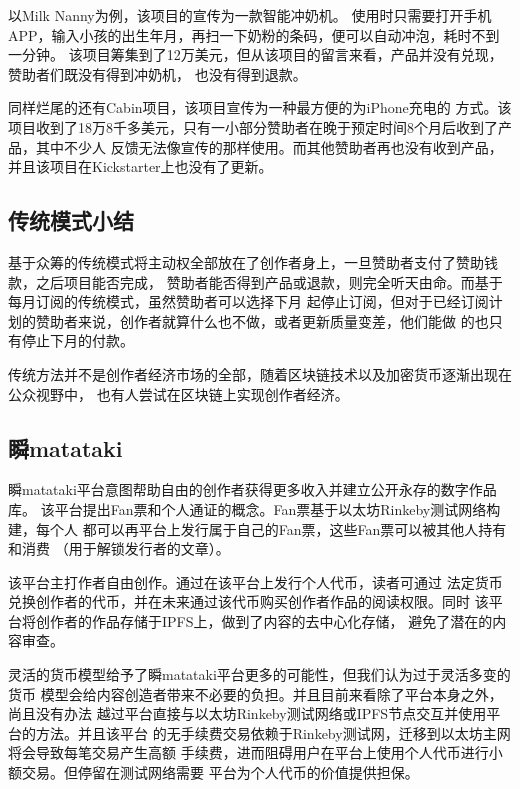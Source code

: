 \documentclass[11pt,UTF8,a4paper]{ctexart}
\begin{document}
    以Milk Nanny为例\cite{kickstarter_milk_nanny}，该项目的宣传为一款智能冲奶机。
    使用时只需要打开手机APP，输入小孩的出生年月，再扫一下奶粉的条码，便可以自动冲泡，耗时不到一分钟。
    该项目筹集到了12万美元，但从该项目的留言来看，产品并没有兑现，赞助者们既没有得到冲奶机，
    也没有得到退款。

    同样烂尾的还有Cabin项目\cite{kickstarter_cabin}，该项目宣传为一种最方便的为iPhone充电的
    方式。该项目收到了18万8千多美元，只有一小部分赞助者在晚于预定时间8个月后收到了产品，其中不少人
    反馈无法像宣传的那样使用。而其他赞助者再也没有收到产品，并且该项目在Kickstarter上也没有了更新。

    \subsection{传统模式小结}\label{subsec:tradition_summary}

    基于众筹的传统模式将主动权全部放在了创作者身上，一旦赞助者支付了赞助钱款，之后项目能否完成，
    赞助者能否得到产品或退款，则完全听天由命。而基于每月订阅的传统模式，虽然赞助者可以选择下月
    起停止订阅，但对于已经订阅计划的赞助者来说，创作者就算什么也不做，或者更新质量变差，他们能做
    的也只有停止下月的付款。

    传统方法并不是创作者经济市场的全部，随着区块链技术以及加密货币逐渐出现在公众视野中，
    也有人尝试在区块链上实现创作者经济。

    \subsection{瞬matataki}\label{subsec:blockchain_matataki}

    瞬matataki平台意图帮助自由的创作者获得更多收入并建立公开永存的数字作品库。
    该平台提出Fan票和个人通证的概念。Fan票基于以太坊Rinkeby测试网络构建，每个人
    都可以再平台上发行属于自己的Fan票，这些Fan票可以被其他人持有和消费
    （用于解锁发行者的文章）\cite{mitataki_fan_ticket}。

    该平台主打作者自由创作。通过在该平台上发行个人代币，读者可通过
    法定货币兑换创作者的代币，并在未来通过该代币购买创作者作品的阅读权限。同时
    该平台将创作者的作品存储于IPFS\cite{ipfs}上，做到了内容的去中心化存储，
    避免了潜在的内容审查。

    灵活的货币模型给予了瞬matataki平台更多的可能性，但我们认为过于灵活多变的货币
    模型会给内容创造者带来不必要的负担。并且目前来看除了平台本身之外，尚且没有办法
    越过平台直接与以太坊Rinkeby测试网络或IPFS节点交互并使用平台的方法。并且该平台
    的无手续费交易依赖于Rinkeby测试网，迁移到以太坊主网将会导致每笔交易产生高额
    手续费，进而阻碍用户在平台上使用个人代币进行小额交易。但停留在测试网络需要
    平台为个人代币的价值提供担保。
\end{document}
